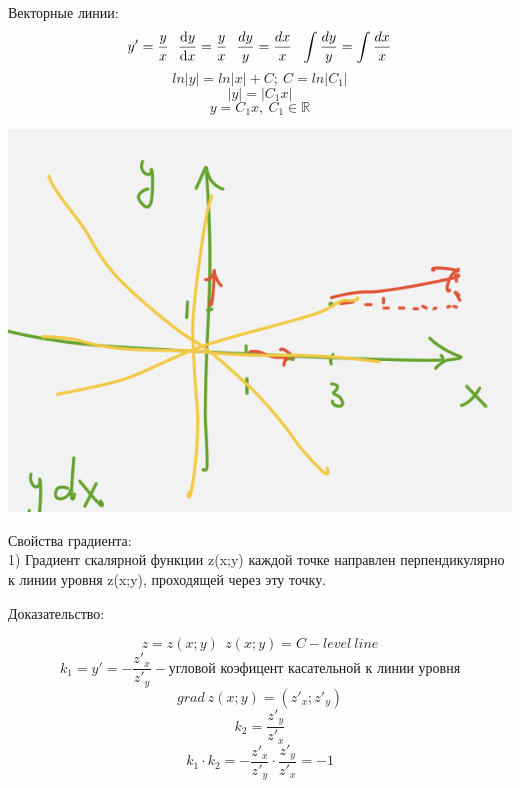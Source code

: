 \documentclass{article}
\begin{document}
Векторные линии:
\begin{equation*}
    y' = \frac{y}{x}\ \ \dv{y}{x}= \frac{y}{x}\ \ \frac{dy}{y}= \frac{dx}{x}\ \ \int\frac{dy}{y} = \int\frac{dx}{x}
\end{equation*}
\begin{equation*}
    ln|y| = ln|x| + C;\ C = ln|C_1|
\end{equation*}
\begin{equation*}
    |y|= |C_1x|
\end{equation*}
\begin{equation*}
    y= C_1x,\ C_1\in \mathbb{R}
\end{equation*}
\begin{center}
    \includegraphics[width=.3\textwidth]{ans_grad.png} 
\end{center}
Свойства градиента:\\
1) Градиент скалярной функции z(x;y) каждой точке направлен перпендикулярно к линии уровня z(x;y), проходящей через эту точку.

Доказательство:

\begin{equation*}
    z = z(x;y)\ \ z(x;y) = C - level\ line
\end{equation*}
\begin{equation*}
    k_1 = y' = -\frac{z'_x}{z'_y} - \text{угловой коэфицент касательной к линии уровня}
\end{equation*}
\begin{equation*}
    grad\ z(x;y) = (z'_x; z'_y)
\end{equation*}
\begin{equation*}
    k_2 = \frac{z'_y}{z'_x}
\end{equation*}
\begin{equation*}
    k_1\cdot k_2 = -\frac{z'_x}{z'_y}\cdot \frac{z'_y}{z'_x} = -1
\end{equation*}
\end{document}
